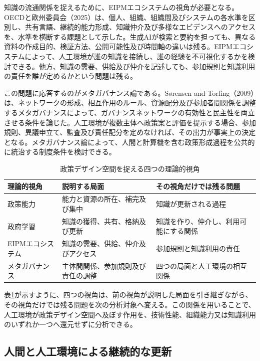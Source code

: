 知識の流通関係を捉えるために、EIPMエコシステムの視角が必要となる。OECDと欧州委員会（2025）は、個人、組織、組織間及びシステムの各水準を区別し、共有言語、継続的能力形成、知識仲介及び多様なエビデンスへのアクセスを、水準を横断する課題として示した\cite{oecd2025eipmecosystems}。生成AIが検索と要約を担っても、異なる資料の作成目的、検証方法、公開可能性及び時間軸の違いは残る。EIPMエコシステムによって、人工環境が誰の知識を接続し、誰の経験を不可視化するかを検討できる。他方、知識の需要、供給及び仲介を記述しても、参加規則と知識利用の責任を誰が定めるかという問題は残る。

この問題に応答するのがメタガバナンス論である。S{\o}rensen and Torfing（2009）は、ネットワークの形成、相互作用のルール、資源配分及び参加者間関係を調整するメタガバナンスによって、ガバナンスネットワークの有効性と民主性を両立させる条件を論じた\cite{sorensen2009metagovernance}。人工環境が複数主体へ政策案と評価を提示する場合、参加規則、異議申立て、監査及び責任配分を定めなければ、その出力が事実上の決定となる。メタガバナンス論によって、人間と計算機を含む政策形成過程を公共的に統治する制度条件を検討できる。

\begin{table}[H]
  \centering
  \caption{政策デザイン空間を捉える四つの理論的視角}
  \label{tab:four_lenses}
  \small
  \begin{tabularx}{\textwidth}{p{}p{}X}
    \toprule
    理論的視角 & 説明する局面 & その視角だけでは残る問題 \\
    \midrule
    政策能力 & 能力と資源の所在、補完及び集中 & 知識が更新される過程 \\
    政府学習 & 知識の獲得、共有、格納及び更新 & 知識を作り、仲介し、利用可能にする関係 \\
    EIPMエコシステム & 知識の需要、供給、仲介及びアクセス & 参加規則と知識利用の責任 \\
    メタガバナンス & 主体間関係、参加規則及び責任の調整 & 四つの局面と人工環境の相互関係 \\
    \bottomrule
  \end{tabularx}
\end{table}

表\ref{tab:four_lenses}が示すように、四つの視角は、前の視角が説明した局面を引き継ぎながら、その視角だけでは残る問題を次の分析対象へ変える。この関係を用いることで、人工環境が政策デザイン空間へ及ぼす作用を、技術性能、組織能力又は知識利用のいずれか一つへ還元せずに分析できる。

\subsection{人間と人工環境による継続的な更新}
\label{subsec:intro_recursive_update}

